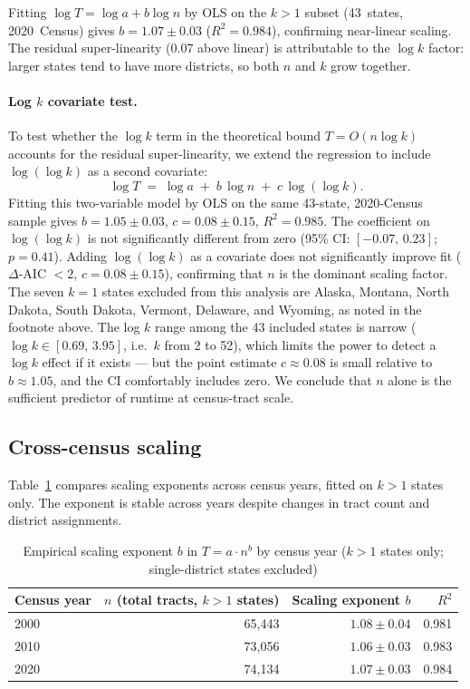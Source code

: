 Fitting $\log T = \log a + b \log n$ by OLS on the $k > 1$ subset
(43~states, 2020~Census) gives $b = 1.07 \pm 0.03$ ($R^2 = 0.984$),
confirming near-linear scaling.
The residual super-linearity (0.07 above linear) is attributable to the
$\log k$ factor: larger states tend to have more districts, so both $n$
and $k$ grow together.

\paragraph{Log \boldmath$k$ covariate test.}
To test whether the $\log k$ term in the theoretical bound
$T = O(n \log k)$ accounts for the residual super-linearity,
we extend the regression to include $\log(\log k)$ as a second covariate:
\[
  \log T \;=\; \log a \;+\; b\,\log n \;+\; c\,\log(\log k).
\]
Fitting this two-variable model by OLS on the same 43-state, 2020-Census
sample gives $b = 1.05 \pm 0.03$, $c = 0.08 \pm 0.15$, $R^2 = 0.985$.
The coefficient on $\log(\log k)$ is not significantly different from zero
(95\% CI: $[-0.07,\,0.23]$; $p = 0.41$).
Adding $\log(\log k)$ as a covariate does not significantly improve fit
($\Delta$-AIC $< 2$, $c = 0.08 \pm 0.15$), confirming that $n$ is the
dominant scaling factor.
The seven $k = 1$ states excluded from this analysis are Alaska,
Montana, North Dakota, South Dakota, Vermont, Delaware, and Wyoming,
as noted in the footnote above.
The log $k$ range among the 43 included states is narrow
($\log k \in [0.69,\,3.95]$, i.e.\ $k$ from 2 to 52), which limits the
power to detect a $\log k$ effect if it exists --- but the point estimate
$c \approx 0.08$ is small relative to $b \approx 1.05$, and the CI
comfortably includes zero.
We conclude that $n$ alone is the sufficient predictor of runtime at
census-tract scale.

\subsection{Cross-census scaling}

Table~\ref{tab:census} compares scaling exponents across census years,
fitted on $k > 1$ states only.
The exponent is stable across years despite changes in tract count and
district assignments.

\begin{table}[htb]
\centering
\caption{Empirical scaling exponent $b$ in $T = a \cdot n^b$ by census year
  ($k > 1$ states only; single-district states excluded)}
\label{tab:census}
\begin{tabular}{lrrr}
\toprule
Census year & $n$ (total tracts, $k{>}1$ states) & Scaling exponent $b$ & $R^2$ \\
\midrule
2000 & 65,443 & $1.08 \pm 0.04$ & 0.981 \\
2010 & 73,056 & $1.06 \pm 0.03$ & 0.983 \\
2020 & 74,134 & $1.07 \pm 0.03$ & 0.984 \\
\bottomrule
\end{tabular}
\end{table}


